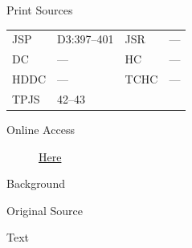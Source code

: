 			\begin{description}
				\item[Print Sources]
			\end{description}

				\begin{tabular}{p{0.5in}p{1in}p{0.5in}p{1in}}
				JSP	 	& D3:397--401		& JSR 		& --- \\
				DC	 	& --- 		& HC 		& --- \\
				HDDC 	& ---		& TCHC 		& --- \\
				TPJS 	& 42--43			& 	 		&  \\
				\end{tabular}
			
			\begin{description}
				\item[Online Access] \href{https://www.josephsmithpapers.org/paper-summary/letter-to-the-church-not-after-18-december-1833/1}{Here}
			\end{description}
			
			\begin{description}
				\item[Background]
			\end{description}
			
			
			\begin{description}
				\item[Original Source]
			\end{description}
			
			
			\begin{description}
				\item[Text]
			\end{description}
			
